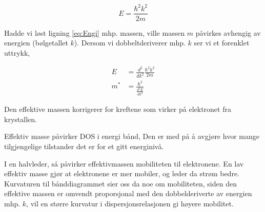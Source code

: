 \begin{equation}
\label{eq:Engi}
    E = \frac{\hbar^2k^2}{2m}
\end{equation}

Hadde vi løst ligning \ref{eq:Engi} mhp. massen, ville massen $m$ påvirkes avhengig av energien (bølgetallet $k$). Dersom vi dobbeltderiverer mhp. $k$ ser vi et forenklet uttrykk,

\begin{equation}
    \label{eq:effectiveMass}
    \begin{split}
        E &= \frac{d^2}{d k^2} \frac{\hbar^2k^2}{2m}\\
        m^* &= \frac{\hbar^2}{\frac{d^2E}{dk^2}}
    \end{split}
\end{equation}

Den effektive massen korrigerer for kreftene som virker på elektronet fra krystallen. 

Effektiv masse påvirker DOS i energi bånd, Den er med på å avgjøre hvor mange tilgjengelige tilstander det er for et gitt energinivå.

I en halvleder, så påvirker effektivmassen mobiliteten til elektronene. En lav effektiv masse gjør at elektronene er mer mobiler, og leder da strøm bedre. Kurvaturen til bånddiagrammet sier oss da noe om mobiliteten, siden den effektive massen er omvendt proporsjonal med den dobbelderiverte av energien mhp. $k$, vil en større kurvatur i  dispersjonsrelasjonen gi høyere mobilitet.